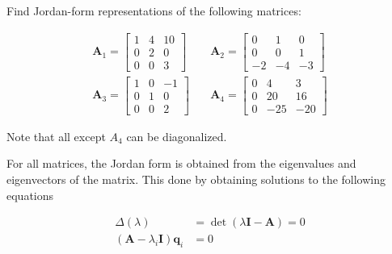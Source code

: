 \item [3.13] Find Jordan-form representations of the following matrices:

\begin{align*}
 \mathbf{A}_1 = \begin{bmatrix}
      1 & 4 & 10 \\
      0 & 2 & 0 \\
      0 & 0 & 3
     \end{bmatrix}
& \quad
\mathbf{A}_2 = \begin{bmatrix}
       0 & 1 & 0 \\
       0 & 0 & 1 \\
       -2 & -4 & -3
      \end{bmatrix}
\\
\mathbf{A}_3 = \begin{bmatrix}
       1 & 0 & -1 \\
       0 & 1 & 0 \\
       0 & 0 & 2
      \end{bmatrix}
& \quad
\mathbf{A}_4 = \begin{bmatrix}
       0 & 4 & 3\\
       0 & 20 & 16\\
       0 & -25 & -20
      \end{bmatrix}
\end{align*}

Note that all except $A_4$ can be diagonalized.

For all matrices, the Jordan form is obtained from the eigenvalues
and eigenvectors of the matrix.
This done by obtaining solutions to the following equations

\begin{align*}
\Delta (\lambda) &= \det(\lambda \mathbf{I} - \mathbf{A}) = 0\\
(\mathbf{A} - \lambda_i \mathbf{I}) \mathbf{q}_i &= 0
\end{align*}

